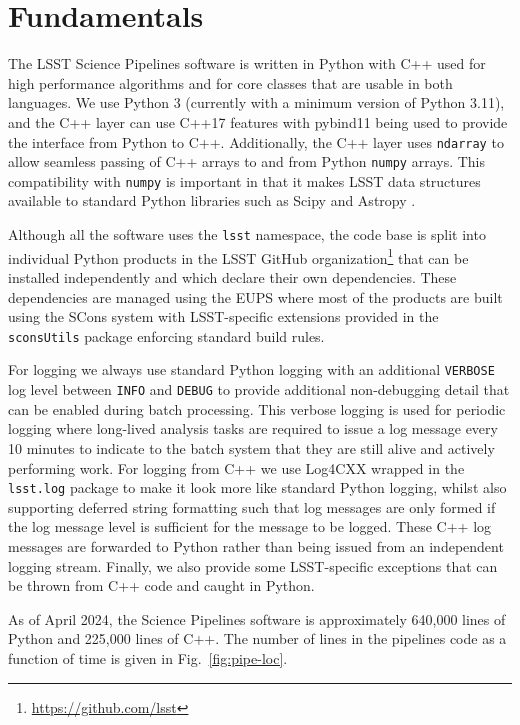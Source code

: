 \section{Fundamentals}

The LSST Science Pipelines software is written in Python with C++ used for high performance algorithms and for core classes that are usable in both languages.
We use Python 3 \citep{2017arXiv171200461J} (currently with a minimum version of Python 3.11), and the C++ layer can use C++17 features with pybind11 being used to provide the interface from Python to C++.
Additionally, the C++ layer uses \texttt{ndarray} to allow seamless passing of C++ arrays to and from Python \texttt{numpy} arrays.
This compatibility with \texttt{numpy} is important in that it makes LSST data structures available to standard Python libraries such as Scipy and Astropy \citep{2016SPIE.9913E..0GJ,2018AJ....156..123A}.

Although all the software uses the \texttt{lsst} namespace, the code base is split into individual Python products in the LSST GitHub organization\footnote{\url{https://github.com/lsst}} that can be installed independently and which declare their own dependencies.
These dependencies are managed using the EUPS \citep{EUPS,2018SPIE10707E..09J} where
most of the products are built using the SCons system \citep{2005Scons1377085} with LSST-specific extensions provided in the \texttt{sconsUtils} package enforcing standard build rules.

For logging we always use standard Python logging with an additional \texttt{VERBOSE} log level between \texttt{INFO} and \texttt{DEBUG} to provide additional non-debugging detail that can be enabled during batch processing.
This verbose logging is used for periodic logging where long-lived analysis tasks are required to issue a log message every 10 minutes to indicate to the batch system that they are still alive and actively performing work.
For logging from C++ we use Log4CXX wrapped in the \texttt{lsst.log} package to make it look more like standard Python logging, whilst also supporting deferred string formatting such that log messages are only formed if the log message level is sufficient for the message to be logged.
These C++ log messages are forwarded to Python rather than being issued from an independent logging stream.
Finally, we also provide some LSST-specific exceptions that can be thrown from C++ code and caught in Python.

As of April 2024, the Science Pipelines software is approximately 640,000 lines of Python and 225,000 lines of C++.
The number of lines in the pipelines code as a function of time is given in Fig.~\ref{fig:pipe-loc}.


